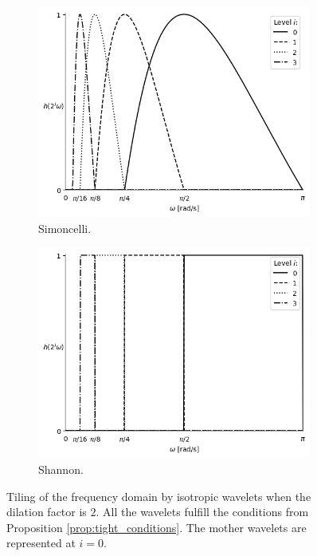 \begin{figure}[H]
\begin{subfigure}[t]{.49\textwidth}
  \end{subfigure}
  \vspace*{\floatsep}
  \begin{subfigure}[t]{.49\textwidth}
    \centering
    \includegraphics[width=0.99\textwidth]{Figures/chapter-wavelets/figures/profileMotherWavelet_Simoncelli_5_Mother.png}
    \captionsetup{width=\textwidth}
    \caption{Simoncelli.}
    \label{fig:mother_simoncelli}
  \end{subfigure}%
  \begin{subfigure}[t]{.49\textwidth}
    \centering
    \includegraphics[width=0.99\textwidth]{Figures/chapter-wavelets/figures/profileMotherWavelet_Shannon_5_Mother.png}
    \captionsetup{width=\textwidth}
    \caption{Shannon.}
    \label{fig:mother_shannon}
  \end{subfigure}
  \caption{Tiling of the frequency domain by isotropic wavelets when the dilation factor is $2$. All the wavelets fulfill the conditions from Proposition \ref{prop:tight_conditions}. The mother wavelets are represented at $i=0$. }
  \label{fig:mother_wavelets}
\end{figure}
